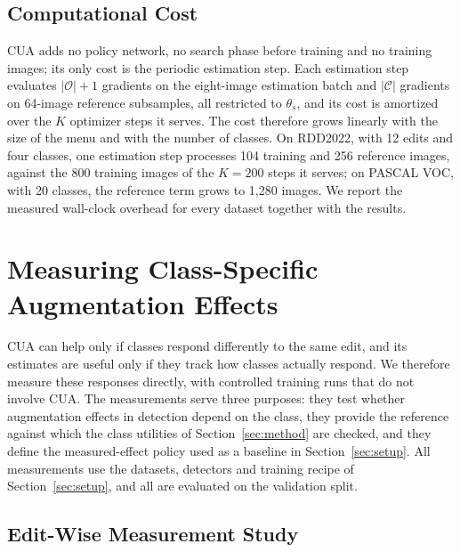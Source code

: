 \documentclass[conference]{IEEEtran}
\begin{document}
\subsection{Computational Cost}
\label{sec:method_cost}

CUA adds no policy network, no search phase before training and no training images; its only cost is the periodic estimation step. Each estimation step evaluates $|\mathcal{O}|+1$ gradients on the eight-image estimation batch and $|\mathcal{C}|$ gradients on 64-image reference subsamples, all restricted to $\theta_s$, and its cost is amortized over the $K$ optimizer steps it serves. The cost therefore grows linearly with the size of the menu and with the number of classes. On RDD2022, with 12 edits and four classes, one estimation step processes 104 training and 256 reference images, against the 800 training images of the $K=200$ steps it serves; on PASCAL VOC, with 20 classes, the reference term grows to 1,280 images. We report the measured wall-clock overhead for every dataset together with the results.

\section{Measuring Class-Specific Augmentation Effects}
\label{sec:measurement}

CUA can help only if classes respond differently to the same edit, and its estimates are useful only if they track how classes actually respond. We therefore measure these responses directly, with controlled training runs that do not involve CUA. The measurements serve three purposes: they test whether augmentation effects in detection depend on the class, they provide the reference against which the class utilities of Section~\ref{sec:method} are checked, and they define the measured-effect policy used as a baseline in Section~\ref{sec:setup}. All measurements use the datasets, detectors and training recipe of Section~\ref{sec:setup}, and all are evaluated on the validation split.

\subsection{Edit-Wise Measurement Study}
\label{sec:measure_editwise}
\end{document}
